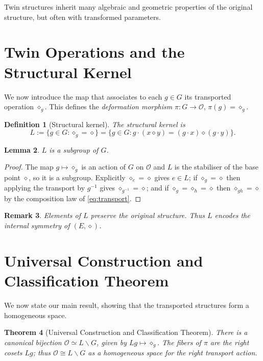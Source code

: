 \documentclass[11pt,a4paper]{article}
\newtheorem{theorem}{Theorem}[section]
\newtheorem{definition}[theorem]{Definition}
\newtheorem{lemma}[theorem]{Lemma}
\newtheorem{remark}[theorem]{Remark}
\begin{document}
	Twin structures inherit many algebraic and geometric properties of the original structure, but often with transformed parameters.
	
	\section{Twin Operations and the Structural Kernel}
	
	We now introduce the map that associates to each $g \in G$ its transported operation $\diamond_g$.
	This defines the \emph{deformation morphism} $\pi : G \to \mathcal{O}$, $\pi(g) = \diamond_g$.
	
	\begin{definition}[Structural kernel]
		The structural kernel is
		\[
		L := \{ g \in G : \diamond_g = \diamond \} = \{ g \in G : g \cdot (x \diamond y) = (g \cdot x) \diamond (g \cdot y) \}.
		\]
	\end{definition}
	
	\begin{lemma}
		$L$ is a subgroup of $G$.
	\end{lemma}
	\begin{proof}
		The map $g\mapsto\diamond_g$ is an action of $G$ on $\mathcal O$ and $L$ is the stabiliser of the base point
		$\diamond$, so it is a subgroup. Explicitly $\diamond_e=\diamond$ gives $e\in L$; if $\diamond_g=\diamond$ then
		applying the transport by $g^{-1}$ gives $\diamond_{g^{-1}}=\diamond$; and if $\diamond_g=\diamond_h=\diamond$
		then $\diamond_{gh}=\diamond$ by the composition law of \eqref{eq:transport}.
	\end{proof}
	
	\begin{remark}
		Elements of $L$ preserve the original structure. Thus $L$ encodes the internal symmetry of $(E, \diamond)$.
	\end{remark}
	
	\section{Universal Construction and Classification Theorem}
	
	We now state our main result, showing that the transported structures form a homogeneous space.
	
	\begin{theorem}[Universal Construction and Classification Theorem]
		There is a canonical bijection $\mathcal{O} \simeq L\backslash G$, given by $Lg \mapsto \diamond_g$.
		The fibers of $\pi$ are the right cosets $Lg$; thus $\mathcal{O} \cong L\backslash G$ as a homogeneous space for the right transport action.
	\end{theorem}
	
\end{document}
